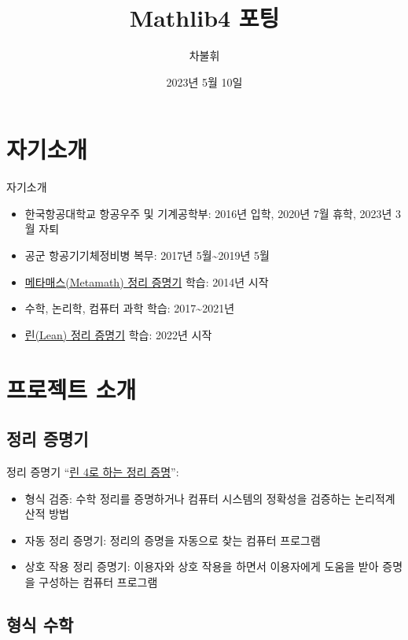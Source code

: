\documentclass{beamer}
\title{Mathlib4 포팅}
\author{차불휘}
\date{2023년 5월 10일}
\begin{document}
\frame{\titlepage}

\section{자기소개}

\begin{frame}{자기소개}
  \begin{itemize}
    \item 한국항공대학교 항공우주 및 기계공학부: 2016년 입학, 2020년 7월 휴학,
      2023년 3월 자퇴
    \item 공군 항공기기체정비병 복무: 2017년 5월\textasciitilde2019년 5월
    \item \href{https://us.metamath.org/index.html}{메타매스(Metamath) 정리 증명기}
      학습: 2014년 시작
    \item 수학, 논리학, 컴퓨터 과학 학습: 2017\textasciitilde2021년
    \item \href{https://leanprover.github.io/}{린(Lean) 정리 증명기} 학습: 2022년
      시작
  \end{itemize}
\end{frame}

\section{프로젝트 소개}

\subsection{정리 증명기}

\begin{frame}{정리 증명기}
  \textquotedblleft \href{https://leanprover.github.io/theorem_proving_in_lean4/introduction.html}
  {린 4로 하는 정리 증명}\textquotedblright \autocite{tpil4}:
  \begin{itemize}
    \item 형식 검증: 수학 정리를 증명하거나 컴퓨터 시스템의 정확성을 검증하는
      논리적\textperiodcentered 계산적 방법
    \item 자동 정리 증명기: 정리의 증명을 자동으로 찾는 컴퓨터 프로그램
    \item 상호 작용 정리 증명기: 이용자와 상호 작용을 하면서 이용자에게 도움을 받아
      증명을 구성하는 컴퓨터 프로그램
  \end{itemize}
\end{frame}

\subsection{형식 수학}
\end{document}
